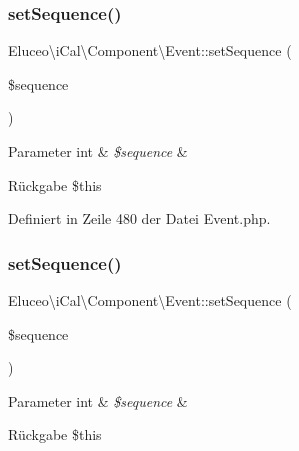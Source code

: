 \subsubsection{\texorpdfstring{set\+Sequence()}{setSequence()}\hspace{0.1cm}{\footnotesize\ttfamily [2/3]}}
{\footnotesize\ttfamily Eluceo\textbackslash{}i\+Cal\textbackslash{}\+Component\textbackslash{}\+Event\+::set\+Sequence (\begin{DoxyParamCaption}\item[{}]{\$sequence }\end{DoxyParamCaption})}


\begin{DoxyParams}[1]{Parameter}
int & {\em \$sequence} & \\
\hline
\end{DoxyParams}
\begin{DoxyReturn}{Rückgabe}
\$this 
\end{DoxyReturn}


Definiert in Zeile 480 der Datei Event.\+php.

\mbox{\label{class_eluceo_1_1i_cal_1_1_component_1_1_event_a87725eac37817e617abbe6d1910790e9}} 
\subsubsection{\texorpdfstring{set\+Sequence()}{setSequence()}\hspace{0.1cm}{\footnotesize\ttfamily [3/3]}}
{\footnotesize\ttfamily Eluceo\textbackslash{}i\+Cal\textbackslash{}\+Component\textbackslash{}\+Event\+::set\+Sequence (\begin{DoxyParamCaption}\item[{}]{\$sequence }\end{DoxyParamCaption})}


\begin{DoxyParams}[1]{Parameter}
int & {\em \$sequence} & \\
\hline
\end{DoxyParams}
\begin{DoxyReturn}{Rückgabe}
\$this 
\end{DoxyReturn}


